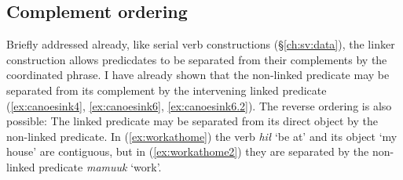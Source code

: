 \begin{comment}
ACTUALLY*2: This works quite well for showing a deictic predicate. Unfortunately it is XL so I cannot use it. Oh well!

ACTUALLY! I think the below is wrong. If you look at XL's sentence, the predicate is deictic ʔaḥʔaa, to which the linker still attaches! This would mean the only counterexample would be Adv V+link. Investigate this further.

But occasionally the linker may occur on the sole predicate in a sentence. This appears to contradict examples (\ref{ex:someonespoke}) and (\ref{ex:*someonespoke}), but the translation provided for these ``dangling" linkers always indicates they are notionally attached to the preceding sentence. I have 1 (TODO: look for more, update number) example from my corpus, involving the word \textit{qʷis} `do so'.\footnote{I am not here counting examples from \textit{tupaat} Julia Lucas, who is unique in always uses the the conjunction \textit{ʔunʔuuƛ} with a linker attached. I believe she has a different lexical entry for the word, and will explain in section (TODO).} I give one example below:

TODO, this is from Charlie Lucas, who I do not have permissions to share. Update it with a sharable example.

Context: \textit{łačiƛni wa. ʔuušciłʔap̓aƛukni nunuuk. ʔuušciłʔap̓aƛukni huyaał.} `We've let it go, haven't we? It has become hard for us to sing. It has become hard for us to dance.'

\ex \label{ex:danglinglinker}
\begingl
\glpreamble ʔaḥʔaa qʷisḥnii.//
\gla ʔaḥʔaa qʷis-(q)ḥ=niˑ //
\glb DDYN do.so-\textsc{link}=\textsc{neut.1pl} //
\glft `That's what happened to us.' //
\endgl
\xe

Although the one predicate is 

\end{comment}


\subsection{Complement ordering} \label{ch:link:participants}

Briefly addressed already, like serial verb constructions (\S\ref{ch:sv:data}), the linker construction allows predicdates to be separated from their complements by the coordinated phrase. I have already shown that the non-linked predicate may be separated from its complement by the intervening linked predicate (\ref{ex:canoesink4}, \ref{ex:canoesink6}, \ref{ex:canoesink6.2}). The reverse ordering is also possible: The linked predicate may be separated from its direct object by the non-linked predicate. In (\ref{ex:workathome}) the verb \textit{hił} `be at' and its object `my house' are contiguous, but in (\ref{ex:workathome2}) they are separated by the non-linked predicate \textit{mamuuk} `work'.

